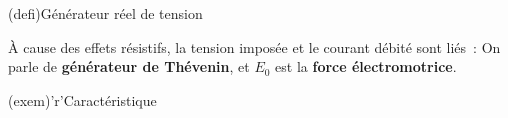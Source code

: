 \documentclass[../../main/main.tex]{subfiles}
\begin{document}
\begin{tcbraster}[raster columns=2, raster equal height=rows]
	\begin{tcb}[label=def:gentens](defi){Générateur réel de tension}
		\begin{isd}[sidebyside align=top]
			À cause des effets résistifs, la tension imposée et le courant débité sont
			liés~:
			\psw{
				\[\boxed{U = E_0 - ri}\]
			}
			\vspace*{-15pt}
			\tcblower
			On parle de \textbf{générateur de Thévenin}, et
			$E_0$ est la \textbf{force électromotrice}.
		\end{isd}
		\vspace*{-15pt}
		\begin{center}
		\end{center}
	\end{tcb}
	\begin{tcb}[label=exem:gentens](exem)'r'{Caractéristique}
		\begin{center}
\end{center}
\end{tcb}
\end{tcbraster}
\end{document}
